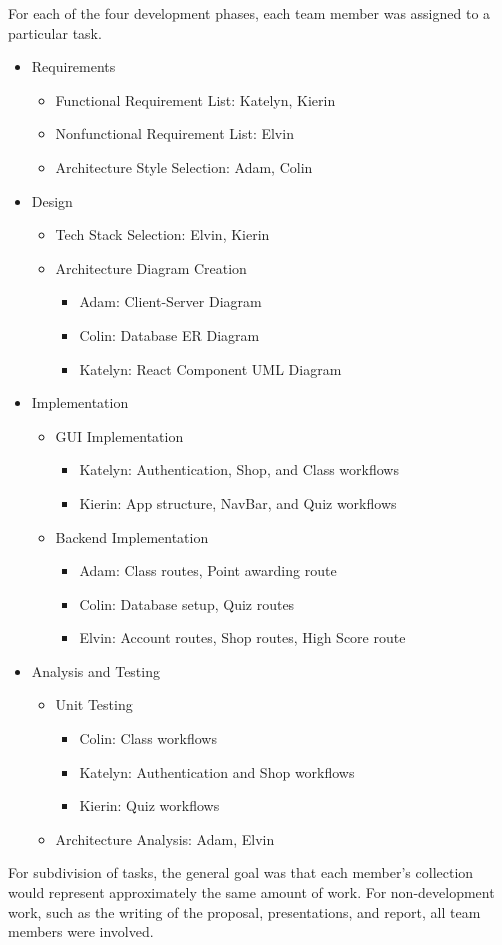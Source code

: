 For each of the four development phases, each team member was assigned to a  particular task.

\begin{itemize}
    \item Requirements
    \begin{itemize}
        \item Functional Requirement List: Katelyn, Kierin
        \item Nonfunctional Requirement List: Elvin
        \item Architecture Style Selection: Adam, Colin
    \end{itemize}
    \item Design
    \begin{itemize}
        \item Tech Stack Selection: Elvin, Kierin
        \item Architecture Diagram Creation
        \begin{itemize}
            \item Adam: Client-Server Diagram
            \item Colin: Database ER Diagram
            \item Katelyn: React Component UML Diagram
        \end{itemize}
    \end{itemize}
    \item Implementation
    \begin{itemize}
        \item GUI Implementation
         \begin{itemize}
            \item Katelyn: Authentication, Shop, and Class workflows
            \item Kierin: App structure, NavBar, and Quiz workflows
        \end{itemize}
        \item Backend Implementation
        \begin{itemize}
            \item Adam: Class routes, Point awarding route
            \item Colin: Database setup, Quiz routes
            \item Elvin: Account routes, Shop routes, High Score route
        \end{itemize}
    \end{itemize}
    \item Analysis and Testing
    \begin{itemize}
        \item Unit Testing
         \begin{itemize}
            \item Colin: Class workflows
            \item Katelyn: Authentication and Shop workflows
            \item Kierin: Quiz workflows
        \end{itemize}
        \item Architecture Analysis: Adam, Elvin
    \end{itemize}
\end{itemize}

For subdivision of tasks, the general goal was that each member's collection would represent approximately the same amount of work. For non-development work, such as the writing of the proposal, presentations, and report, all team members were involved.